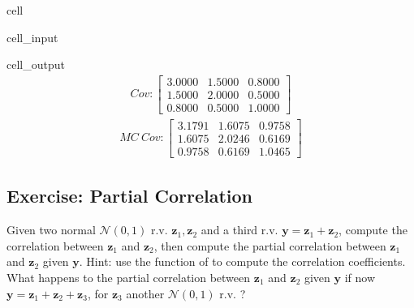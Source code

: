 \documentclass[letterpaper,10pt,english]{jupyterBook}
\begin{document}
\begin{sphinxuseclass}{cell}
\begin{sphinxVerbatimInput}
\begin{sphinxuseclass}{cell_input}
\begin{sphinxVerbatim}[commandchars=\\\{\}]
\end{sphinxVerbatim}

\end{sphinxuseclass}\end{sphinxVerbatimInput}
\begin{sphinxVerbatimOutput}

\begin{sphinxuseclass}{cell_output}\begin{equation*}
\begin{split}\displaystyle Cov:\left[
\begin{array}{}
  3.0000 &  1.5000 &  0.8000\\
  1.5000 &  2.0000 &  0.5000\\
  0.8000 &  0.5000 &  1.0000
\end{array}
\right]\end{split}
\end{equation*}\begin{equation*}
\begin{split}\displaystyle MC\ Cov:\left[
\begin{array}{}
  3.1791 &  1.6075 &  0.9758\\
  1.6075 &  2.0246 &  0.6169\\
  0.9758 &  0.6169 &  1.0465
\end{array}
\right]\end{split}
\end{equation*}
\noindent{}

\end{sphinxuseclass}\end{sphinxVerbatimOutput}

\end{sphinxuseclass}

\subsection{Exercise: Partial Correlation}
\label{\detokenize{01:exercise-partial-correlation}}
\sphinxAtStartPar
Given two normal \(\mathcal{N}(0, 1)\) r.v. \(\mathbf z_1, \mathbf z_2\) and a third r.v. \(\mathbf y = \mathbf z_1 + \mathbf z_2\), compute the correlation between \(\mathbf z_1\) and \(\mathbf z_2\), then compute the partial correlation between \(\mathbf z_1\) and \(\mathbf z_2\) given \(\mathbf y\). Hint: use the function  of  to compute the correlation coefficients. What happens to the partial correlation between \(\mathbf z_1\) and \(\mathbf z_2\) given \(\mathbf y\) if now  \(\mathbf y = \mathbf z_1 + \mathbf z_2 + \mathbf z_3\), for \(\mathbf z_3\) another \(\mathcal{N}(0, 1)\) r.v. ?
\end{document}
